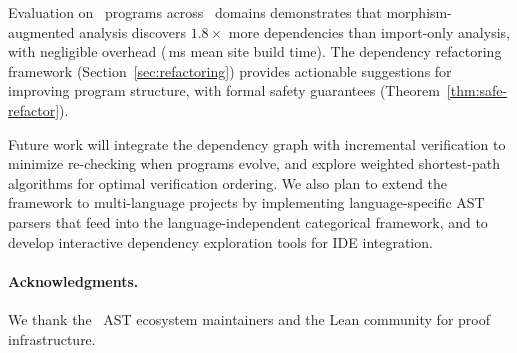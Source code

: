 \documentclass[11pt]{article}
\begin{document}
Evaluation on \compTotalPrograms\ programs across \expDomainCount\ domains
demonstrates that morphism-augmented analysis discovers $1.8\times$ more
dependencies than import-only analysis, with negligible overhead
(\compSiteMeanBuildMs\,ms mean site build time).  The dependency
refactoring framework (Section~\ref{sec:refactoring}) provides actionable
suggestions for improving program structure, with formal safety guarantees
(Theorem~\ref{thm:safe-refactor}).

Future work will integrate the dependency graph with incremental
verification to minimize re-checking when programs evolve, and explore
weighted shortest-path algorithms for optimal verification ordering.
We also plan to extend the framework to multi-language projects by
implementing language-specific AST parsers that feed into the
language-independent categorical framework, and to develop interactive
dependency exploration tools for IDE integration.

\paragraph{Acknowledgments.}
We thank the \Python\ AST ecosystem maintainers and the Lean community
for proof infrastructure.
\end{document}
